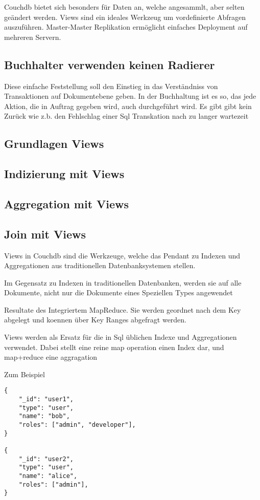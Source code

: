 Couchdb bietet sich besonders für Daten an, welche angesammlt, aber selten geändert werden.
Views sind ein ideales Werkzeug um vordefinierte Abfragen auszuführen.
Master-Master Replikation ermöglicht einfaches Deployment auf mehreren Servern.


\subsection{Buchhalter verwenden keinen Radierer}

Diese einfache Feststellung soll den Einstieg in das Verständniss von Transaktionen auf Dokumentebene geben.
In der Buchhaltung ist es so, das jede Aktion, die in Auftrag gegeben wird, auch durchgeführt wird.
Es gibt gibt kein Zurück wie z.b. den Fehlschlag einer Sql Transkation nach zu langer wartezeit

\subsection{Grundlagen Views}
\subsection{Indizierung mit Views}
\subsection{Aggregation mit Views}
\subsection{Join mit Views}



Views in Couchdb sind die Werkzeuge,
welche das Pendant zu Indexen und Aggregationen
aus traditionellen Datenbanksystemen stellen.

Im Gegensatz zu Indexen in traditionellen Datenbanken, werden sie auf alle Dokumente,
nicht nur die Dokumente eines Speziellen Types angewendet


Resultate des Integriertem MapReduce.
Sie werden geordnet nach dem Key abgelegt und koennen über Key Ranges abgefragt werden.


Views werden als Ersatz für die in Sql üblichen Indexe und Aggregationen verwendet.
Dabei stellt eine  reine map operation einen Index dar, und map+reduce eine aggragation

\newpage
Zum Beispiel

\begin{verbatim}
{
    "_id": "user1",
    "type": "user",
    "name": "bob",
    "roles": ["admin", "developer"],
}

{
    "_id": "user2",
    "type": "user",
    "name": "alice",
    "roles": ["admin"],
}
\end{verbatim}


